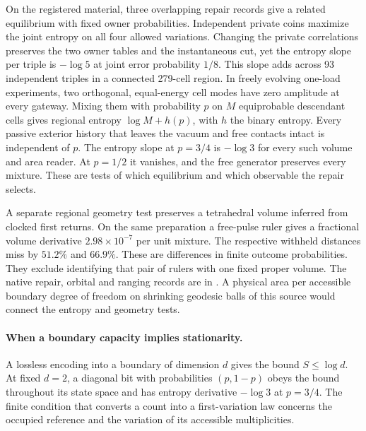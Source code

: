 \documentclass[11pt]{article}
\begin{document}
On the registered material, three overlapping repair records give a
related equilibrium with fixed owner probabilities. Independent private
coins maximize the joint entropy on all four allowed variations. Changing
the private correlations preserves the two owner tables and the
instantaneous cut, yet the entropy slope per triple is $-\log 5$ at
joint error probability $1/8$. This slope adds across 93 independent
triples in a connected 279-cell region. In freely evolving one-load
experiments, two orthogonal, equal-energy cell modes have zero amplitude
at every gateway. Mixing them with probability $p$ on $M$ equiprobable
descendant cells gives regional entropy $\log M+h(p)$, with $h$ the
binary entropy. Every passive exterior history that leaves the vacuum
and free contacts intact is independent of $p$. The entropy slope at
$p=3/4$ is $-\log 3$ for every such volume and area reader. At $p=1/2$
it vanishes, and the free generator preserves every mixture. These are
tests of which equilibrium and which observable the repair selects.

A separate regional geometry test preserves a tetrahedral volume
inferred from clocked first returns. On the same preparation a
free-pulse ruler gives a fractional volume derivative
$2.98\times10^{-7}$ per unit mixture. The respective withheld distances
miss by $51.2\%$ and $66.9\%$. These are differences in finite outcome
probabilities. They exclude identifying that pair of rulers with one
fixed proper volume. The native repair, orbital and ranging records
are in . A physical
area per accessible boundary degree of freedom on shrinking geodesic
balls of this source would connect the entropy and geometry tests.

\paragraph{When a boundary capacity implies stationarity.}
\label{par:capacity-stationarity-test}
A lossless encoding into a boundary of dimension $d$ gives the bound
$S\leq\log d$. At fixed $d=2$, a diagonal bit with probabilities
$(p,1-p)$ obeys the bound throughout its state space and has entropy
derivative $-\log 3$ at $p=3/4$. The finite condition that converts
a count into a first-variation law concerns the occupied reference
and the variation of its accessible multiplicities.
\end{document}
